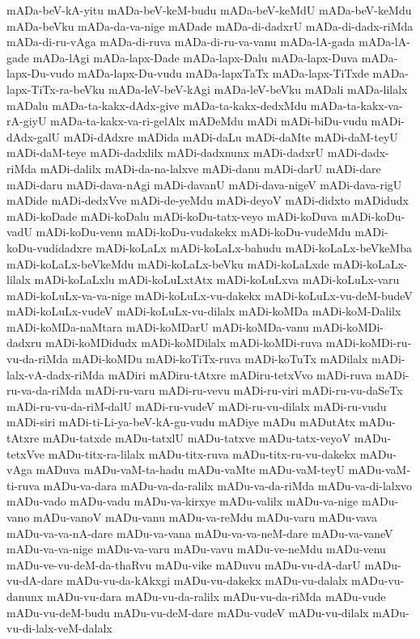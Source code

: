 {mADa-beV-kA-yitu
mADa-beV-keM-budu
mADa-beV-keMdU
mADa-beV-keMdu
mADa-beVku
mADa-da-va-nige
mADade
mADa-di-dadxrU
mADa-di-dadx-riMda
mADa-di-ru-vAga
mADa-di-ruva
mADa-di-ru-va-vanu
mADa-lA-gada
mADa-lA-gade
mADa-lAgi
mADa-lapx-Dade
mADa-lapx-Dalu
mADa-lapx-Duva
mADa-lapx-Du-vudo
mADa-lapx-Du-vudu
mADa-lapxTaTx
mADa-lapx-TiTxde
mADa-lapx-TiTx-ra-beVku
mADa-leV-beV-kAgi
mADa-leV-beVku
mADali
mADa-lilalx
mADalu
mADa-ta-kakx-dAdx-give
mADa-ta-kakx-dedxMdu
mADa-ta-kakx-va-rA-giyU
mADa-ta-kakx-va-ri-gelAlx
mADeMdu
mADi
mADi-biDu-vudu
mADi-dAdx-galU
mADi-dAdxre
mADida
mADi-daLu
mADi-daMte
mADi-daM-teyU
mADi-daM-teye
mADi-dadxlilx
mADi-dadxnunx
mADi-dadxrU
mADi-dadx-riMda
mADi-dalilx
mADi-da-na-lalxve
mADi-danu
mADi-darU
mADi-dare
mADi-daru
mADi-dava-nAgi
mADi-davanU
mADi-dava-nigeV
mADi-dava-rigU
mADide
mADi-dedxVve
mADi-de-yeMdu
mADi-deyoV
mADi-didxto
mADidudx
mADi-koDade
mADi-koDalu
mADi-koDu-tatx-veyo
mADi-koDuva
mADi-koDu-vadU
mADi-koDu-venu
mADi-koDu-vudakekx
mADi-koDu-vudeMdu
mADi-koDu-vudidadxre
mADi-koLaLx
mADi-koLaLx-bahudu
mADi-koLaLx-beVkeMba
mADi-koLaLx-beVkeMdu
mADi-koLaLx-beVku
mADi-koLaLxde
mADi-koLaLx-lilalx
mADi-koLaLxlu
mADi-koLuLxtAtx
mADi-koLuLxva
mADi-koLuLx-varu
mADi-koLuLx-va-va-nige
mADi-koLuLx-vu-dakekx
mADi-koLuLx-vu-deM-budeV
mADi-koLuLx-vudeV
mADi-koLuLx-vu-dilalx
mADi-koMDa
mADi-koM-Dalilx
mADi-koMDa-naMtara
mADi-koMDarU
mADi-koMDa-vanu
mADi-koMDi-dadxru
mADi-koMDidudx
mADi-koMDilalx
mADi-koMDi-ruva
mADi-koMDi-ru-vu-da-riMda
mADi-koMDu
mADi-koTiTx-ruva
mADi-koTuTx
mADilalx
mADi-lalx-vA-dadx-riMda
mADiri
mADiru-tAtxre
mADiru-tetxVvo
mADi-ruva
mADi-ru-va-da-riMda
mADi-ru-varu
mADi-ru-vevu
mADi-ru-viri
mADi-ru-vu-daSeTx
mADi-ru-vu-da-riM-dalU
mADi-ru-vudeV
mADi-ru-vu-dilalx
mADi-ru-vudu
mADi-siri
mADi-ti-Li-ya-beV-kA-gu-vudu
mADiye
mADu
mADutAtx
mADu-tAtxre
mADu-tatxde
mADu-tatxlU
mADu-tatxve
mADu-tatx-veyoV
mADu-tetxVve
mADu-titx-ra-lilalx
mADu-titx-ruva
mADu-titx-ru-vu-dakekx
mADu-vAga
mADuva
mADu-vaM-ta-hadu
mADu-vaMte
mADu-vaM-teyU
mADu-vaM-ti-ruva
mADu-va-dara
mADu-va-da-ralilx
mADu-va-da-riMda
mADu-va-di-lalxvo
mADu-vado
mADu-vadu
mADu-va-kirxye
mADu-valilx
mADu-va-nige
mADu-vano
mADu-vanoV
mADu-vanu
mADu-va-reMdu
mADu-varu
mADu-vava
mADu-va-va-nA-dare
mADu-va-vana
mADu-va-va-neM-dare
mADu-va-vaneV
mADu-va-va-nige
mADu-va-varu
mADu-vavu
mADu-ve-neMdu
mADu-venu
mADu-ve-vu-deM-da-thaRvu
mADu-vike
mADuvu
mADu-vu-dA-darU
mADu-vu-dA-dare
mADu-vu-da-kAkxgi
mADu-vu-dakekx
mADu-vu-dalalx
mADu-vu-danunx
mADu-vu-dara
mADu-vu-da-ralilx
mADu-vu-da-riMda
mADu-vude
mADu-vu-deM-budu
mADu-vu-deM-dare
mADu-vudeV
mADu-vu-dilalx
mADu-vu-di-lalx-veM-dalalx
}
